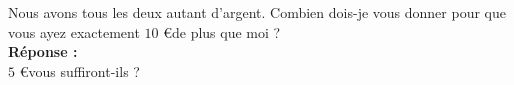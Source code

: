 Nous avons tous les deux autant d'argent. Combien dois-je vous donner pour 
que vous ayez exactement $10$ \euro de plus que moi ?\\

\textbf{Réponse :}\\

$5$ \euro vous suffiront-ils ?
